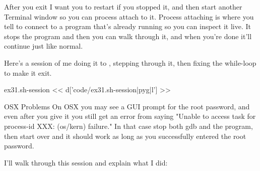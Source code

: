 After you exit  I want you to restart  if you
stopped it, and then start another Terminal window so you can process attach to
it.  Process attaching is where you tell  to connect to a program
that's already running so you can inspect it live.  It stops the program and
then you can walk through it, and when you're done it'll continue just like
normal.

Here's a session of me doing it to , stepping through it, then
fixing the while-loop to make it exit.

\begin{code}{ex31.sh-session}
<< d['code/ex31.sh-session|pyg|l'] >>
\end{code}

\begin{aside}{OSX Problems}
On OSX you may see a GUI prompt for the root password, and even after you
give it you still get an error from  saying "Unable to access task for process-id XXX: (os/kern) failure."  In that case stop both gdb and the
 program, then start over and it should work as long as you
successfully entered the root password.
\end{aside}

I'll walk through this session and explain what I did:

